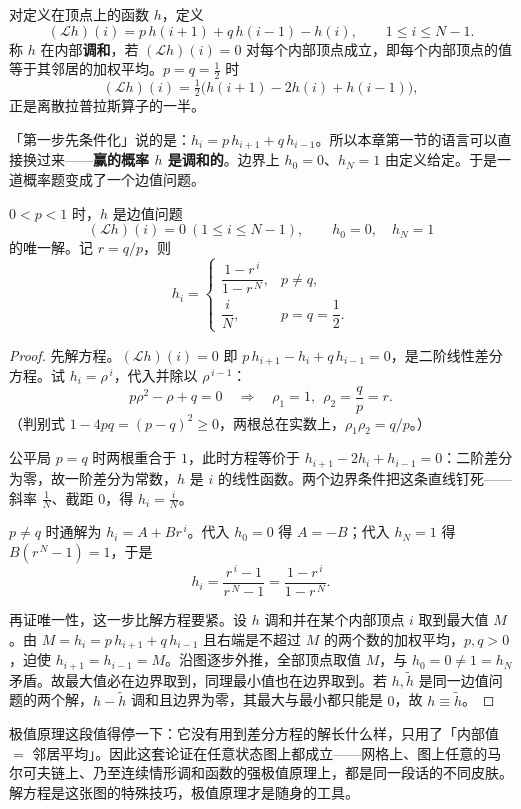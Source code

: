 \begin{definition}[生成元与调和函数]
对定义在顶点上的函数 $h$，定义
\[
(\mathcal{L}h)(i)=p\,h(i+1)+q\,h(i-1)-h(i),\qquad 1\le i\le N-1 .
\]
称 $h$ 在内部\textbf{调和}，若 $(\mathcal{L}h)(i)=0$ 对每个内部顶点成立，即每个内部顶点的值等于其邻居的加权平均。$p=q=\frac12$ 时
\[
(\mathcal{L}h)(i)=\tfrac12\big(h(i+1)-2h(i)+h(i-1)\big),
\]
正是离散拉普拉斯算子的一半。
\end{definition}

「第一步先条件化」说的是：$h_i=p\,h_{i+1}+q\,h_{i-1}$。所以本章第一节的语言可以直接换过来——\textbf{赢的概率 $h$ 是调和的}。边界上 $h_0=0$、$h_N=1$ 由定义给定。于是一道概率题变成了一个边值问题。

\begin{theorem}[赌徒破产]
$0<p<1$ 时，$h$ 是边值问题
\[
(\mathcal{L}h)(i)=0\ (1\le i\le N-1),\qquad h_0=0,\quad h_N=1
\]
的唯一解。记 $r=q/p$，则
\[
h_i=\begin{cases}
\dfrac{1-r^{\,i}}{1-r^{\,N}}, & p\ne q,\\[10pt]
\dfrac{i}{N}, & p=q=\dfrac12 .
\end{cases}
\]
\end{theorem}

\begin{proof}
先解方程。$(\mathcal{L}h)(i)=0$ 即 $p\,h_{i+1}-h_i+q\,h_{i-1}=0$，是二阶线性差分方程。试 $h_i=\rho^{\,i}$，代入并除以 $\rho^{\,i-1}$：
\[
p\rho^{2}-\rho+q=0
\quad\Longrightarrow\quad
\rho_1=1,\ \ \rho_2=\frac{q}{p}=r .
\]
（判别式 $1-4pq=(p-q)^2\ge0$，两根总在实数上，$\rho_1\rho_2=q/p$。）

公平局 $p=q$ 时两根重合于 $1$，此时方程等价于 $h_{i+1}-2h_i+h_{i-1}=0$：二阶差分为零，故一阶差分为常数，$h$ 是 $i$ 的线性函数。两个边界条件把这条直线钉死——斜率 $\frac1N$、截距 $0$，得 $h_i=\frac iN$。

$p\ne q$ 时通解为 $h_i=A+B r^{\,i}$。代入 $h_0=0$ 得 $A=-B$；代入 $h_N=1$ 得 $B(r^{\,N}-1)=1$，于是
\[
h_i=\frac{r^{\,i}-1}{r^{\,N}-1}=\frac{1-r^{\,i}}{1-r^{\,N}} .
\]

再证唯一性，这一步比解方程要紧。设 $h$ 调和并在某个内部顶点 $i$ 取到最大值 $M$。由 $M=h_i=p\,h_{i+1}+q\,h_{i-1}$ 且右端是不超过 $M$ 的两个数的加权平均，$p,q>0$，迫使 $h_{i+1}=h_{i-1}=M$。沿图逐步外推，全部顶点取值 $M$，与 $h_0=0\ne1=h_N$ 矛盾。故最大值必在边界取到，同理最小值也在边界取到。若 $h,\tilde h$ 是同一边值问题的两个解，$h-\tilde h$ 调和且边界为零，其最大与最小都只能是 $0$，故 $h\equiv\tilde h$。
\end{proof}

极值原理这段值得停一下：它没有用到差分方程的解长什么样，只用了「内部值 $=$ 邻居平均」。因此这套论证在任意状态图上都成立——网格上、图上任意的马尔可夫链上、乃至连续情形调和函数的强极值原理上，都是同一段话的不同皮肤。解方程是这张图的特殊技巧，极值原理才是随身的工具。

